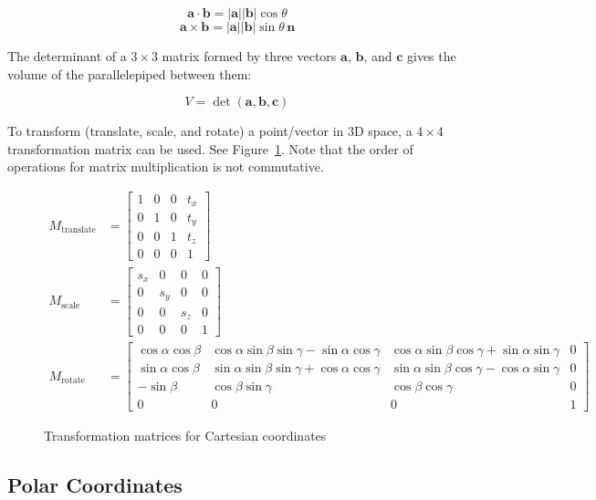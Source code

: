 \[
\mathbf{a}\cdot\mathbf{b} = |\mathbf{a}||\mathbf{b}|\cos\theta
\]
\[
\mathbf{a}\times\mathbf{b} = |\mathbf{a}||\mathbf{b}|\sin\theta \, \mathbf{n}
\]

The determinant of a $3\times 3$ matrix formed by three vectors $\mathbf{a}$, $\mathbf{b}$, and $\mathbf{c}$ 
gives the volume of the parallelepiped between them\cite{strang2016introduction,stewart2020calculus}:

\[
V = \det(\mathbf{a},\mathbf{b},\mathbf{c})
\]

To transform (translate, scale, and rotate) a point/vector in 3D space, 
a $4\times 4$ transformation matrix can be used. See Figure~\ref{eq:transformation-matrix}.
Note that the order of operations for matrix multiplication is not commutative.~\cite{strang2016introduction}

\begin{figure}[!t]
\begin{align}
M_{\text{translate}} &= 
\begin{bmatrix} 
    1 & 0 & 0 & t_x \\ 0 & 1 & 0 & t_y \\ 0 & 0 & 1 & t_z \\ 0 & 0 & 0 & 1 
\end{bmatrix}
\\
M_{\text{scale}} &= 
\begin{bmatrix} 
    s_x & 0 & 0 & 0 \\ 0 & s_y & 0 & 0 \\ 0 & 0 & s_z & 0 \\ 0 & 0 & 0 & 1 
\end{bmatrix}
\\
M_{\text{rotate}} &= 
\begin{bmatrix} 
    \cos\alpha\cos\beta & \cos\alpha\sin\beta\sin\gamma - \sin\alpha\cos\gamma & \cos\alpha\sin\beta\cos\gamma + \sin\alpha\sin\gamma & 0 \\ 
    \sin\alpha\cos\beta & \sin\alpha\sin\beta\sin\gamma + \cos\alpha\cos\gamma & \sin\alpha\sin\beta\cos\gamma - \cos\alpha\sin\gamma & 0 \\ 
    -\sin\beta & \cos\beta\sin\gamma & \cos\beta\cos\gamma & 0 \\ 
    0 & 0 & 0 & 1 
\end{bmatrix}
\end{align}
\caption{Transformation matrices for Cartesian coordinates}
\label{eq:transformation-matrix}
\end{figure}

\subsection{Polar Coordinates}\label{subsec:polar-coordinates}

